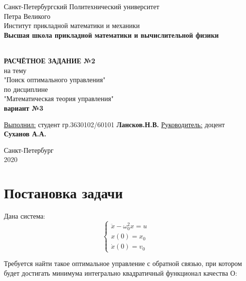 \documentclass[12pt]{article}
\renewcommand{\listoffigures}{\begingroup  %
\tocsection
\tocfile{\listfigurename}{lof}
\endgroup}
\renewcommand{\listoftables}{\begingroup  %
\tocsection
\tocfile{\listtablename}{lot}
\endgroup}
\begin{document}
\begin{titlepage}
	\center
		Санкт-Петербургский Политехнический 
		университет \\ Петра Великого\\
		Институт прикладной математики и механики
		\\ \textbf{Высшая школа прикладной математики и вычислительной физики}

	\vfill ~
	\textbf{
		\\ \large РАСЧЁТНОЕ ЗАДАНИЕ №2
	}
	\\	на тему 
	\\ "Поиск оптимального управления"
	\\ по дисциплине
	\\ "Математическая теория управления"
    \\ \textbf{вариант №3}
	\vfill ~
    
    
    \begin{flushleft}
    \underline{Выполнил:}  \hspace{\fill} студент гр.3630102/60101 \textbf{Лансков.Н.В.} \linebreak[2]
	\underline{Руководитель:} \hspace{\fill} доцент \textbf{Суханов А.А.} \\ 
    \end{flushleft}
    

\vfill

{\large}	Санкт-Петербург
\\ 2020
\end{titlepage}


\tableofcontents
\pagebreak

\section{Постановка задачи}

Дана система:
\begin{equation}\label{eq1}
 \begin{cases}
  \ddot x - \omega_0^2x = u\\
  x(0) = x_0 \\
  \dot x(0) = v_0
 \end{cases}
\end{equation}

Требуется найти такое оптимальное управление с обратной связью, при котором будет достигать минимума интегрально квадратичный функционал качества О:
\end{document}

